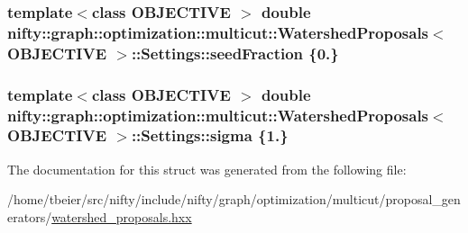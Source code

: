 \subsubsection[{seed\+Fraction}]{\setlength{\rightskip}{0pt plus 5cm}template$<$class O\+B\+J\+E\+C\+T\+I\+V\+E $>$ double {\bf nifty\+::graph\+::optimization\+::multicut\+::\+Watershed\+Proposals}$<$ O\+B\+J\+E\+C\+T\+I\+V\+E $>$\+::Settings\+::seed\+Fraction \{0.\}}\label{structnifty_1_1graph_1_1optimization_1_1multicut_1_1WatershedProposals_1_1Settings_a9b4f54691c04ebb732815734b75fcd3c}
\hypertarget{structnifty_1_1graph_1_1optimization_1_1multicut_1_1WatershedProposals_1_1Settings_af12c49798d57f8d825fccd28b8fe1deb}{}
\subsubsection[{sigma}]{\setlength{\rightskip}{0pt plus 5cm}template$<$class O\+B\+J\+E\+C\+T\+I\+V\+E $>$ double {\bf nifty\+::graph\+::optimization\+::multicut\+::\+Watershed\+Proposals}$<$ O\+B\+J\+E\+C\+T\+I\+V\+E $>$\+::Settings\+::sigma \{1.\}}\label{structnifty_1_1graph_1_1optimization_1_1multicut_1_1WatershedProposals_1_1Settings_af12c49798d57f8d825fccd28b8fe1deb}


The documentation for this struct was generated from the following file\+:\begin{DoxyCompactItemize}
\item 
/home/tbeier/src/nifty/include/nifty/graph/optimization/multicut/proposal\+\_\+generators/\hyperlink{watershed__proposals_8hxx}{watershed\+\_\+proposals.\+hxx}\end{DoxyCompactItemize}
